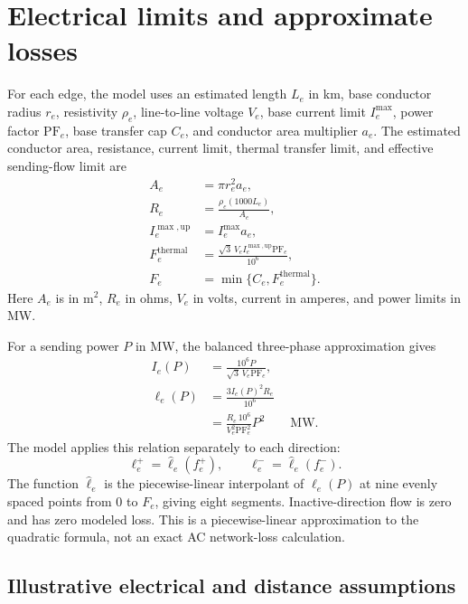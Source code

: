 \documentclass[11pt]{article}
\begin{document}
\section{Electrical limits and approximate losses}

For each edge, the model uses an estimated length \(L_e\) in km, base conductor
radius \(r_e\), resistivity \(\rho_e\), line-to-line voltage \(V_e\), base
current limit \(I^{\max}_e\), power factor \(\mathrm{PF}_e\), base transfer cap
\(C_e\), and conductor area multiplier \(a_e\). The estimated conductor area,
resistance, current limit, thermal transfer limit, and effective sending-flow
limit are
\begin{align}
A_e &= \pi r_e^2 a_e,\\
R_e &= \frac{\rho_e(1000L_e)}{A_e},\\
I^{\max,\mathrm{up}}_e &= I^{\max}_e a_e,\\
F^{\mathrm{thermal}}_e
&= \frac{\sqrt{3}\,V_e I^{\max,\mathrm{up}}_e\mathrm{PF}_e}{10^6},\\
F_e &= \min\{C_e,F^{\mathrm{thermal}}_e\}.
\label{eq:flow-limit}
\end{align}
Here \(A_e\) is in m\(^2\), \(R_e\) in ohms, \(V_e\) in volts, current in
amperes, and power limits in MW.

For a sending power \(P\) in MW, the balanced three-phase approximation gives
\begin{align}
I_e(P) &= \frac{10^6P}{\sqrt{3}\,V_e\mathrm{PF}_e},\\
\ell_e(P) &= \frac{3I_e(P)^2R_e}{10^6}\\
&= \frac{R_e\,10^6}{V_e^2\mathrm{PF}_e^2}P^2
\qquad \text{MW}.
\label{eq:loss}
\end{align}
The model applies this relation separately to each direction:
\begin{equation}
\ell_e^+ = \widehat{\ell}_e(f_e^+),\qquad
\ell_e^- = \widehat{\ell}_e(f_e^-).
\label{eq:pwl-loss}
\end{equation}
The function \(\widehat{\ell}_e\) is the piecewise-linear interpolant of
\(\ell_e(P)\) at nine evenly spaced points from \(0\) to \(F_e\), giving eight
segments. Inactive-direction flow is zero and has zero modeled loss. This is a
piecewise-linear approximation to the quadratic formula, not an exact AC
network-loss calculation.

\subsection{Illustrative electrical and distance assumptions}
\end{document}
